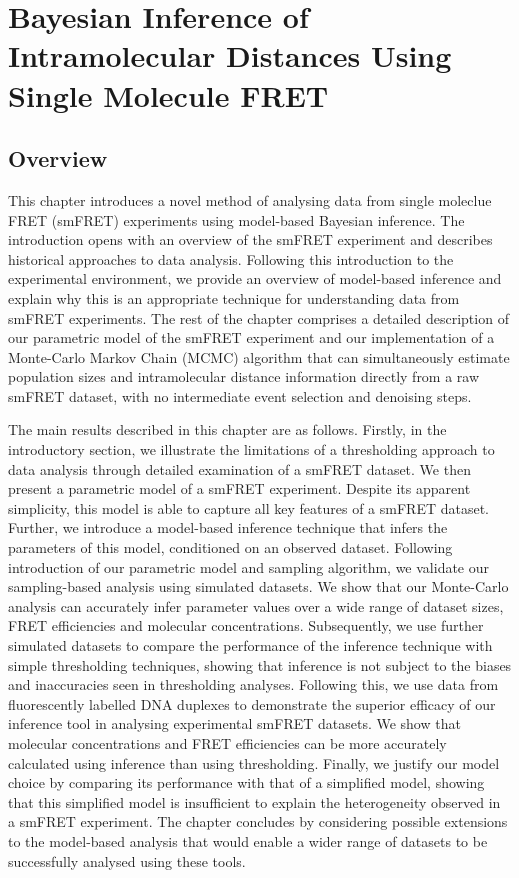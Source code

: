 \chapter{Bayesian Inference of Intramolecular Distances Using Single Molecule FRET}
\label{chap:inference}

\section{Overview}
This chapter introduces a novel method of analysing data from single moleclue FRET (smFRET) experiments using model-based Bayesian inference. The introduction opens with an overview of the smFRET experiment and describes historical approaches to data analysis. Following this introduction to the experimental environment, we provide an overview of model-based inference and explain why this is an appropriate technique for understanding data from smFRET experiments. The rest of the chapter comprises a detailed description of our parametric model of the smFRET experiment and our implementation of a Monte-Carlo Markov Chain (MCMC) algorithm that can simultaneously estimate population sizes and intramolecular distance information directly from a raw smFRET dataset, with no intermediate event selection and denoising steps.

The main results described in this chapter are as follows. Firstly, in the introductory section, we illustrate the limitations of a thresholding approach to data analysis through detailed examination of a smFRET dataset. We then present a parametric model of a smFRET experiment. Despite its apparent simplicity, this model is able to capture all key features of a smFRET dataset. Further, we introduce a model-based inference technique that infers the parameters of this model, conditioned on an observed dataset. Following introduction of our parametric model and sampling algorithm, we validate our sampling-based analysis using simulated datasets. We show that our Monte-Carlo analysis can accurately infer parameter values over a wide range of dataset sizes, FRET efficiencies and molecular concentrations. Subsequently, we use further simulated datasets to compare the performance of the inference technique with simple thresholding techniques, showing that inference is not subject to the biases and inaccuracies seen in thresholding analyses. Following this, we use data from fluorescently labelled DNA duplexes to demonstrate the superior efficacy of our inference tool in analysing experimental smFRET datasets. We show that molecular concentrations and FRET efficiencies can be more accurately calculated using inference than using thresholding. Finally, we justify our model choice by comparing its performance with that of a simplified model, showing that this simplified model is insufficient to explain the heterogeneity observed in a smFRET experiment. The chapter concludes by considering possible extensions to the model-based analysis that would enable a wider range of datasets to be successfully analysed using these tools.        


